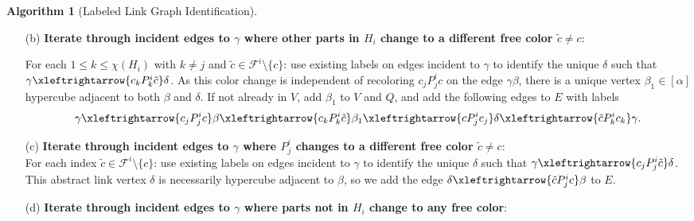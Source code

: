 \documentclass{amsart}
\theoremstyle{hypothesisstyle}
\theoremstyle{definition}
\newtheorem{algorithm}[alg]{Algorithm}
\theoremstyle{remark}
\numberwithin{equation}{section}
\begin{document}
\begin{algorithm}[Labeled Link Graph Identification]
\begin{enumerate}
\begin{itemize}
    For each $1\le k\le \chi(H_i)$ with $k\neq j$: use existing labels on edges incident to $\gamma$ to identify the unique $\delta$ such that $\gamma \xleftrightarrow{c_kP^i_{k}c}  \delta$.  By exploring hypercube adjacent neighbors, and using Algorithm~\ref{algo:partitions} to confirm that each vertex we consider is in $[\alpha]$, find the shortest sequence of vertices in $[\alpha] \setminus \{\gamma\}$ from $\beta$ to $\delta$ where two consecutive vertices are antipodal points of hypercubes of alternating dimensions $|P_{j}^{i}|$ and $|P_{k}^i|$.  By Lemma~\ref{lem:length-4-path},  this path is $\beta,\beta_1,\beta_2,\beta_3,\delta$. If not already in $V$, add $\beta_1,\beta_2,\beta_3$ (in this order) to $V$ and $Q$.  Add the following edges to $E$ with labels 
\[\gamma \xleftrightarrow{c_jP^i_{j}c}  \beta\xleftrightarrow{c_kP^i_{k}c_j} \beta_1\xleftrightarrow{cP^i_{j}c_k}\beta_2 \xleftrightarrow{c_jP^i_{k}c} \beta_3\xleftrightarrow{c_kP^i_{j}c_j} \delta\xleftrightarrow{cP^i_{k}c_k}  \gamma.
\]
\item[(b)]\label{step:alg3:squares-in-component}{\bf Iterate through incident edges to $\gamma$ where other parts in $H_i$ change to a different free color $\tilde c\ne c$}: 

For each $1\le k\le \chi(H_i)$ with $k\neq j$ and $\tilde{c}\in\mathcal{F}^i\setminus\{c\}$: use existing labels on edges incident to $\gamma$ to identify the unique $\delta$ such that $\gamma \xleftrightarrow{c_kP^i_{k}\tilde{c}}  \delta$. As this color change is independent of recoloring $c_jP^i_jc$ on the edge $\gamma\beta$, there is a unique vertex $\beta_1\in[\alpha]$ hypercube adjacent to both $\beta$ and $\delta$.  If not already in $V$, add $\beta_1$ to $V$ and $Q$, and add the following edges to $E$ with labels
\[\gamma \xleftrightarrow{c_jP^i_{j}c}  \beta\xleftrightarrow{c_kP^i_{k}\tilde{c}} \beta_1\xleftrightarrow{cP^i_{j}c_j}\delta\xleftrightarrow{\tilde{c}P^i_{k}c_k}  \gamma.
\]
\item[(c)]\label{step:alg3:cliques}{\bf Iterate through incident edges to $\gamma$ where $P^i_j$ changes to a different free color $\tilde c\ne c$}: \\ For each index $\tilde{c}\in\mathcal{F}^i\setminus\{c\}$: use existing labels on edges incident to $\gamma$ to identify the unique $\delta$ such that $\gamma \xleftrightarrow{c_j P^i_{j}\tilde{c}}  \delta$.  This abstract link vertex $\delta$ is necessarily hypercube adjacent to $\beta$, so we add the edge $\delta\xleftrightarrow{\tilde{c}P^i_{j}c}  \beta$ to $E$.
\item[(d)]\label{step:alg3:squares-out-component}{\bf Iterate through incident edges to $\gamma$ where parts not in $H_i$ change to any free color}: 


\end{itemize}
\end{enumerate}
\end{algorithm}
\end{document}
